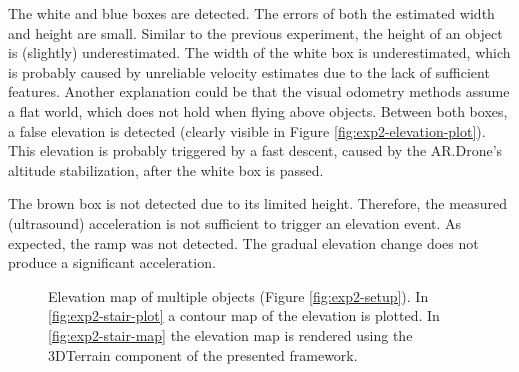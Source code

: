 The white and blue boxes are detected.
The errors of both the estimated width and height are small.
Similar to the previous experiment, the height of an object is (slightly) underestimated.
The width of the white box is underestimated, which is probably caused by unreliable velocity estimates due to the lack of sufficient features.
Another explanation could be that the visual odometry methods assume a flat world, which does not hold when flying above objects.
Between both boxes, a false elevation is detected (clearly visible in Figure \ref{fig:exp2-elevation-plot}).
This elevation is probably triggered by a fast descent, caused by the AR.Drone's altitude stabilization, after the white box is passed.

The brown box is not detected due to its limited height.
Therefore, the measured (ultrasound) acceleration is not sufficient to trigger an elevation event.
As expected, the ramp was not detected.
The gradual elevation change does not produce a significant acceleration.

\begin{figure}[htb!]
  \begin{center}

 \end{center}
  \caption{Elevation map of multiple objects (Figure \ref{fig:exp2-setup}). In \ref{fig:exp2-stair-plot} a contour map of the elevation is plotted. In \ref{fig:exp2-stair-map} the elevation map is rendered using the 3DTerrain component of the presented framework.}
  \label{fig:exp2-2-results}
\end{figure}